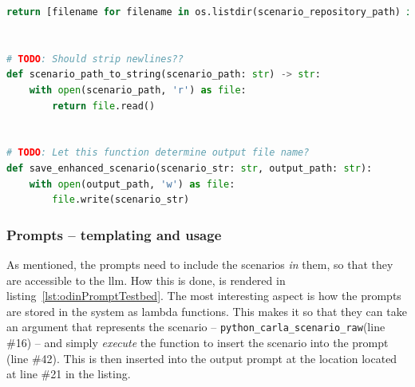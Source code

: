 \begin{lstlisting}[caption={scenario\_utils.py, The implementation of an various scenaro helper functions for executing prompts.}, label={lst:odinScenarioUtils}, language={Python}]
    return [filename for filename in os.listdir(scenario_repository_path) if extension_is_ok(filename)]


# TODO: Should strip newlines??
def scenario_path_to_string(scenario_path: str) -> str:
    with open(scenario_path, 'r') as file:
        return file.read()


# TODO: Let this function determine output file name?
def save_enhanced_scenario(scenario_str: str, output_path: str):
    with open(output_path, 'w') as file:
        file.write(scenario_str)
\end{lstlisting}

\subsubsection{Prompts -- templating and usage}

As mentioned, the prompts need to include the scenarios \emph{in} them, so that
they are accessible to the \acrshort{llm}. How this is done, is rendered in
listing~\ref{lst:odinPromptTestbed}. The most interesting aspect is how the
prompts are stored in the system as lambda functions. This makes it so that they
can take an argument that represents the scenario --
\texttt{python\_carla\_scenario\_raw}(line \#16) -- and simply \emph{execute} the
function to insert the scenario into the prompt (line \#42). This is then
inserted into the output prompt at the location located at line \#21 in the listing.

